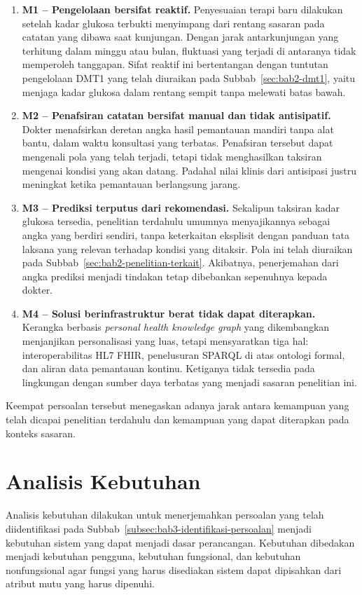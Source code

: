 \begin{enumerate}
    \item \textbf{M1 -- Pengelolaan bersifat reaktif.} Penyesuaian terapi baru dilakukan setelah kadar glukosa terbukti menyimpang dari rentang sasaran pada catatan yang dibawa saat 
    kunjungan. Dengan jarak antarkunjungan yang terhitung dalam minggu atau bulan, fluktuasi yang terjadi di antaranya tidak memperoleh tanggapan. Sifat reaktif ini bertentangan 
    dengan tuntutan pengelolaan DMT1 yang telah diuraikan pada Subbab~\ref{sec:bab2-dmt1}, yaitu menjaga kadar glukosa dalam rentang sempit tanpa melewati batas bawah.
    \item \textbf{M2 -- Penafsiran catatan bersifat manual dan tidak antisipatif.} Dokter menafsirkan deretan angka hasil pemantauan mandiri tanpa alat bantu, dalam waktu konsultasi 
    yang terbatas. Penafsiran tersebut dapat mengenali pola yang telah terjadi, tetapi tidak menghasilkan taksiran mengenai kondisi yang akan datang. Padahal nilai klinis dari 
    antisipasi justru meningkat ketika pemantauan berlangsung jarang.
    \item \textbf{M3 -- Prediksi terputus dari rekomendasi.} Sekalipun taksiran kadar glukosa tersedia, penelitian terdahulu umumnya menyajikannya sebagai angka yang berdiri sendiri, 
    tanpa keterkaitan eksplisit dengan panduan tata laksana yang relevan terhadap kondisi yang ditaksir. Pola ini telah diuraikan pada Subbab~\ref{sec:bab2-penelitian-terkait}. 
    Akibatnya, penerjemahan dari angka prediksi menjadi tindakan tetap dibebankan sepenuhnya kepada dokter.
    \item \textbf{M4 -- Solusi berinfrastruktur berat tidak dapat diterapkan.} Kerangka berbasis \emph{personal health knowledge graph} yang dikembangkan \textcite{rad2024} menjanjikan
    personalisasi yang luas, tetapi mensyaratkan tiga hal: interoperabilitas HL7 FHIR, penelusuran SPARQL di atas ontologi formal, dan aliran data pemantauan kontinu.
    Ketiganya tidak tersedia pada lingkungan dengan sumber daya terbatas yang menjadi sasaran penelitian ini.
\end{enumerate}

Keempat persoalan tersebut menegaskan adanya jarak antara kemampuan yang telah dicapai penelitian terdahulu dan kemampuan yang dapat diterapkan pada konteks sasaran.

\section{Analisis Kebutuhan}
\label{sec:bab3-analisis-kebutuhan}
Analisis kebutuhan dilakukan untuk menerjemahkan persoalan yang telah diidentifikasi pada Subbab~\ref{subsec:bab3-identifikasi-persoalan} menjadi kebutuhan sistem yang dapat menjadi
dasar perancangan. Kebutuhan dibedakan menjadi kebutuhan pengguna, kebutuhan fungsional, dan kebutuhan nonfungsional agar fungsi yang harus disediakan sistem dapat dipisahkan dari
atribut mutu yang harus dipenuhi.

